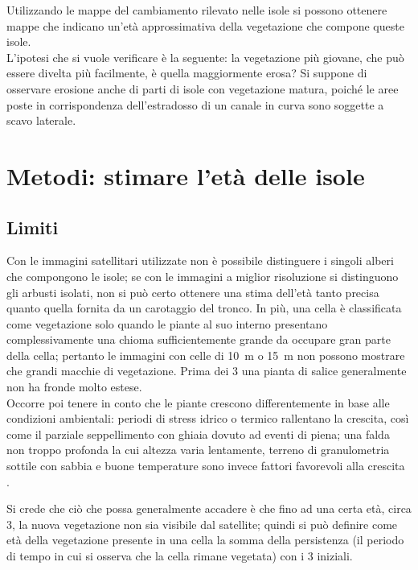 Utilizzando le mappe del cambiamento rilevato nelle isole si possono ottenere mappe che indicano un'età approssimativa della vegetazione che compone queste isole. 
\\
L'ipotesi che si vuole verificare è la seguente: la vegetazione più giovane, che può essere divelta più facilmente, è quella maggiormente erosa?
Si suppone di osservare erosione anche di parti di isole con vegetazione matura, poiché le aree poste in corrispondenza dell'estradosso di un canale in curva sono soggette a scavo laterale.

\section{Metodi: stimare l'età delle isole}
\label{sec:eta}

\subsection{Limiti}
Con le immagini satellitari utilizzate non è possibile distinguere i singoli alberi che compongono le isole; se con le immagini a miglior risoluzione si distinguono gli arbusti isolati, non si può certo ottenere una stima dell'età tanto precisa quanto quella fornita da un carotaggio del tronco.
In più, una cella è classificata come vegetazione solo quando le piante al suo interno presentano complessivamente una chioma sufficientemente grande da occupare gran parte della cella; pertanto le immagini con celle di \SI{10}{\m} o  \SI{15}{\m} non possono mostrare che grandi macchie di vegetazione.
Prima dei \SI{3}{\anni} una pianta di salice generalmente non ha fronde molto estese.
\\
Occorre poi tenere in conto che le piante crescono differentemente in base alle condizioni ambientali: periodi di stress idrico o termico rallentano la crescita, così come il parziale seppellimento con ghiaia dovuto ad eventi di piena; una falda non troppo profonda la cui altezza varia lentamente, terreno di granulometria sottile con sabbia e buone temperature sono invece fattori favorevoli alla crescita .

Si crede che ciò che possa generalmente accadere è che fino ad una certa età, circa \SI{3}{\anni}, la nuova vegetazione non sia visibile dal satellite; quindi si può definire come età della vegetazione presente in una cella la somma della persistenza (il periodo di tempo in cui si osserva che la cella rimane vegetata) con i \SI{3}{\anni} iniziali. 

